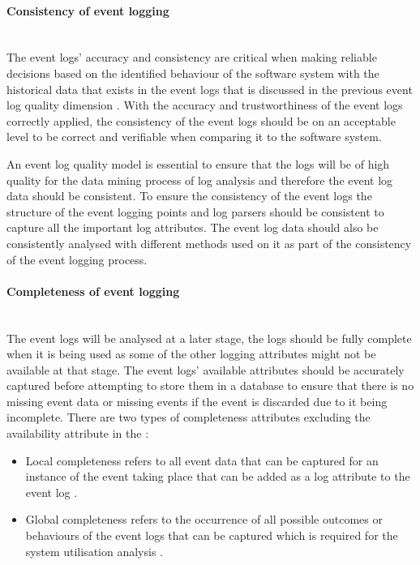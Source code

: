 \paragraph{Consistency of event logging}\leavevmode\\
The event logs' accuracy and consistency are critical when making reliable decisions based on the identified behaviour of the software system with the historical data that exists in the event logs that is discussed in the previous event log quality dimension \cite{Stojanov2017, Kherbouche2017}. With the accuracy and trustworthiness of the event logs correctly applied, the consistency of the event logs should be on an acceptable level to be correct and verifiable when comparing it to the software system. \par An event log quality model is essential to ensure that the logs will be of high quality for the data mining process of log analysis and therefore the event log data should be consistent. To ensure the consistency of the event logs the structure of the event logging points and log parsers should be consistent to capture all the important log attributes. The event log data should also be consistently analysed with different methods used on it as part of the consistency of the event logging process.

\paragraph{Completeness of event logging}\leavevmode\\ 
The event logs will be analysed at a later stage, the logs should be fully complete when it is being used as some of the other logging attributes might not be available at that stage. The event logs' available attributes should be accurately captured before attempting to store them in a database to ensure that there is no missing event data or missing events if the event is discarded due to it being incomplete. There are two types of completeness attributes excluding the availability attribute in the :

\begin{itemize}
	\item Local completeness refers to all event data that can be captured for an instance of the event taking place that can be added as a log attribute to the event log \cite{Kherbouche2017, VanDerAalst2004}.
	\item Global completeness refers to the occurrence of all possible outcomes or behaviours of the event logs that can be captured which is required for the system utilisation analysis \cite{Kherbouche2017, VanDerAalst2004}.
\end{itemize}

